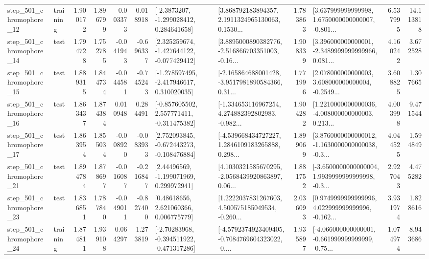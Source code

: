 \begin{tabular}{llrrrrllrlrr}
  step\_501\_chromophore\_12 &  training &      1.900172 &    1.896799 &     -0.003373 &  0.018918 &     [-2.3873207, -1.299028412, 0.284641658] &  [3.868792183894357, 2.1911324965130063, 0.1530... &       1.783863 &  [3.637999999999998, 1.6750000000000007, -0.801... &            6.537995 &         14.113818 \\
  step\_501\_chromophore\_14 &      test &      1.794728 &    1.752785 &     -0.041943 & -0.696337 &   [2.325259674, -1.427644122, -0.077429412] &  [3.8895000890382776, -2.516866703351003, -0.16... &       1.908339 &  [3.396000000000001, -2.3489999999999966, 0.081... &            4.160242 &          3.672528 \\
  step\_501\_chromophore\_15 &      test &      1.889315 &    1.844734 &     -0.044581 & -0.745243 &   [-1.278597495, -2.417946617, 0.310020035] &  [-2.165864688001428, -3.9517981890584366, 0.31... &       1.771996 &  [2.078000000000003, 3.608000000000004, -0.2549... &            3.608825 &          1.307665 \\
  step\_501\_chromophore\_16 &      test &      1.863437 &    1.874384 &      0.010948 &  0.284491 &   [-0.857605502, 2.557771411, -0.311475382] &  [-1.334653116967254, 4.274882392802983, -0.982... &       1.904282 &  [1.2210000000000036, -4.008000000000003, 0.213... &            4.003998 &          9.471544 \\
  step\_501\_chromophore\_17 &      test &      1.863954 &    1.855034 &     -0.008920 & -0.083933 &   [2.752093845, -0.672443273, -0.108476884] &  [-4.539668434727227, 1.2846109183265888, 0.298... &       1.899069 &  [3.8760000000000012, -1.1630000000000038, -0.3... &            4.044525 &          1.594849 \\
  step\_501\_chromophore\_21 &      test &      1.894784 &    1.878697 &     -0.016087 & -0.216847 &     [2.44496569, -1.199071969, 0.299972941] &  [4.1030321585670295, -2.0568439920863897, 0.06... &       1.881752 &  [-3.6500000000000004, 1.9939999999999998, -0.3... &            2.927043 &          4.475282 \\
  step\_501\_chromophore\_23 &      test &      1.836851 &    1.787840 &     -0.049011 & -0.827400 &      [0.48618656, 2.621060366, 0.006775779] &  [1.2222037831267603, 4.500575185049534, -0.260... &       2.036093 &  [0.9749999999999996, 4.022999999999996, -0.162... &            3.931974 &          1.828616 \\
  step\_501\_chromophore\_24 &  training &      1.874811 &    1.939108 &      0.064297 &  1.273819 &   [-2.70283968, -0.394511922, -0.471317286] &  [-4.5792374923409405, -0.7084769604323022, -0.... &       1.935897 &  [-4.066000000000001, -0.661999999999999, -0.75... &            1.074974 &          8.943686 \\

\end{tabular}
